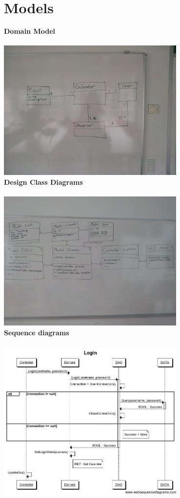 \documentclass[a4paper,10pt,titlepage]{article}
\begin{document}
\section{Models}
\textbf{Domain Model}
\\ \\
\includegraphics[width=0.7\textwidth]{./domainmodel}\\[1cm] 
\textbf{Design Class Diagrams}
\\ \\
\includegraphics[width=0.7\textwidth]{./DCD}\\[2cm] 
\textbf{Sequence diagrams }
\\ \\
\includegraphics[width=0.7\textwidth]{./loginssd}\\[1cm] 
\end{document}
